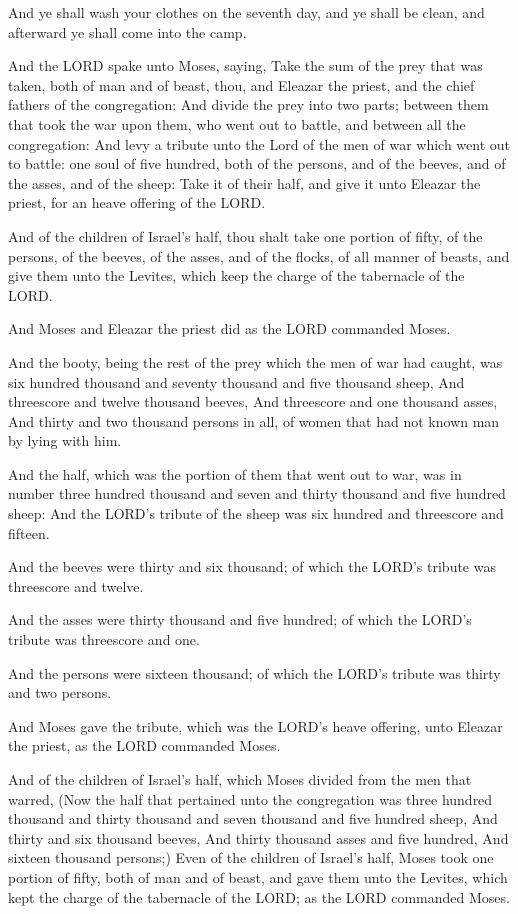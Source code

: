 \verse And ye shall wash your clothes on the seventh day, and ye shall
be clean, and afterward ye shall come into the camp.

\verse And the LORD spake unto Moses, saying, \verse Take the sum of the
prey that was taken, both of man and of beast, thou, and Eleazar the
priest, and the chief fathers of the congregation: \verse And divide
the prey into two parts; between them that took the war upon them, who
went out to battle, and between all the congregation: \verse And levy a
tribute unto the Lord of the men of war which went out to battle: one
soul of five hundred, both of the persons, and of the beeves, and of
the asses, and of the sheep: \verse Take it of their half, and give it
unto Eleazar the priest, for an heave offering of the LORD.

\verse And of the children of Israel's half, thou shalt take one
portion of fifty, of the persons, of the beeves, of the asses, and of
the flocks, of all manner of beasts, and give them unto the Levites,
which keep the charge of the tabernacle of the LORD.

\verse And Moses and Eleazar the priest did as the LORD commanded
Moses.

\verse And the booty, being the rest of the prey which the men of war
had caught, was six hundred thousand and seventy thousand and five
thousand sheep, \verse And threescore and twelve thousand beeves, \verse
And threescore and one thousand asses, \verse And thirty and two
thousand persons in all, of women that had not known man by lying with
him.

\verse And the half, which was the portion of them that went out to
war, was in number three hundred thousand and seven and thirty
thousand and five hundred sheep: \verse And the LORD's tribute of the
sheep was six hundred and threescore and fifteen.

\verse And the beeves were thirty and six thousand; of which the LORD's
tribute was threescore and twelve.

\verse And the asses were thirty thousand and five hundred; of which
the LORD's tribute was threescore and one.

\verse And the persons were sixteen thousand; of which the LORD's
tribute was thirty and two persons.

\verse And Moses gave the tribute, which was the LORD's heave offering,
unto Eleazar the priest, as the LORD commanded Moses.

\verse And of the children of Israel's half, which Moses divided from
the men that warred, \verse (Now the half that pertained unto the
congregation was three hundred thousand and thirty thousand and seven
thousand and five hundred sheep, \verse And thirty and six thousand
beeves, \verse And thirty thousand asses and five hundred, \verse And
sixteen thousand persons;) \verse Even of the children of Israel's
half, Moses took one portion of fifty, both of man and of beast, and
gave them unto the Levites, which kept the charge of the tabernacle of
the LORD; as the LORD commanded Moses.

